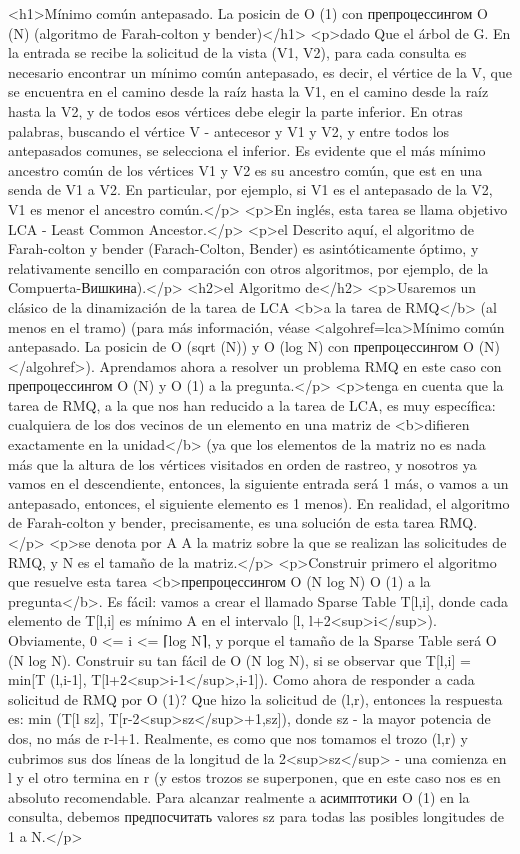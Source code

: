 <h1>Mínimo común antepasado. La posicin de O (1) con препроцессингом O (N) (algoritmo de Farah-colton y bender)</h1>
<p>dado Que el árbol de G. En la entrada se recibe la solicitud de la vista (V1, V2), para cada consulta es necesario encontrar un mínimo común antepasado, es decir, el vértice de la V, que se encuentra en el camino desde la raíz hasta la V1, en el camino desde la raíz hasta la V2, y de todos esos vértices debe elegir la parte inferior. En otras palabras, buscando el vértice V - antecesor y V1 y V2, y entre todos los antepasados comunes, se selecciona el inferior. Es evidente que el más mínimo ancestro común de los vértices V1 y V2 es su ancestro común, que est en una senda de V1 a V2. En particular, por ejemplo, si V1 es el antepasado de la V2, V1 es menor el ancestro común.</p>
<p>En inglés, esta tarea se llama objetivo LCA - Least Common Ancestor.</p>
<p>el Descrito aquí, el algoritmo de Farah-colton y bender (Farach-Colton, Bender) es asintóticamente óptimo, y relativamente sencillo en comparación con otros algoritmos, por ejemplo, de la Compuerta-Вишкина).</p>
<h2>el Algoritmo de</h2>
<p>Usaremos un clásico de la dinamización de la tarea de LCA <b>a la tarea de RMQ</b> (al menos en el tramo) (para más información, véase <algohref=lca>Mínimo común antepasado. La posicin de O (sqrt (N)) y O (log N) con препроцессингом O (N)</algohref>). Aprendamos ahora a resolver un problema RMQ en este caso con препроцессингом O (N) y O (1) a la pregunta.</p>
<p>tenga en cuenta que la tarea de RMQ, a la que nos han reducido a la tarea de LCA, es muy específica: cualquiera de los dos vecinos de un elemento en una matriz de <b>difieren exactamente en la unidad</b> (ya que los elementos de la matriz no es nada más que la altura de los vértices visitados en orden de rastreo, y nosotros ya vamos en el descendiente, entonces, la siguiente entrada será 1 más, o vamos a un antepasado, entonces, el siguiente elemento es 1 menos). En realidad, el algoritmo de Farah-colton y bender, precisamente, es una solución de esta tarea RMQ.</p>
<p>se denota por A A la matriz sobre la que se realizan las solicitudes de RMQ, y N es el tamaño de la matriz.</p>
<p>Construir primero el algoritmo que resuelve esta tarea <b>препроцессингом O (N log N) O (1) a la pregunta</b>. Es fácil: vamos a crear el llamado Sparse Table T[l,i], donde cada elemento de T[l,i] es mínimo A en el intervalo [l, l+2<sup>i</sup>). Obviamente, 0 <= i <= ⌈log N⌉, y porque el tamaño de la Sparse Table será O (N log N). Construir su tan fácil de O (N log N), si se observar que T[l,i] = min[T (l,i-1], T[l+2<sup>i-1</sup>,i-1]). Como ahora de responder a cada solicitud de RMQ por O (1)? Que hizo la solicitud de (l,r), entonces la respuesta es: min (T[l sz], T[r-2<sup>sz</sup>+1,sz]), donde sz - la mayor potencia de dos, no más de r-l+1. Realmente, es como que nos tomamos el trozo (l,r) y cubrimos sus dos líneas de la longitud de la 2<sup>sz</sup> - una comienza en l y el otro termina en r (y estos trozos se superponen, que en este caso nos es en absoluto recomendable. Para alcanzar realmente a асимптотики O (1) en la consulta, debemos предпосчитать valores sz para todas las posibles longitudes de 1 a N.</p>
